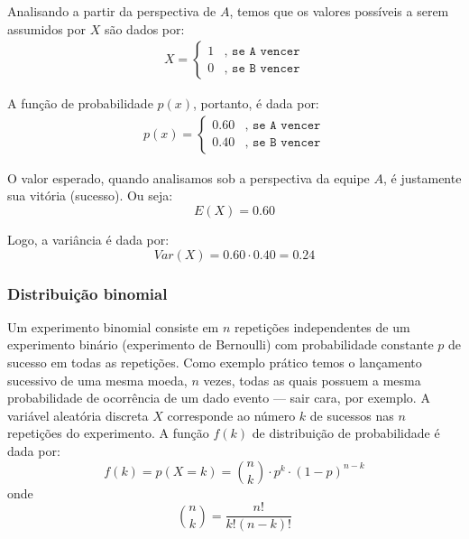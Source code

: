 \begin{sol}
Analisando a partir da perspectiva de $A$, temos que os valores possíveis a
serem assumidos por $X$ são dados por:
\begin{equation*}
    \begin{split}
    X =
    \begin{cases}
        1 & \texttt{, se A vencer} \\
        0 & \texttt{, se B vencer}
    \end{cases}
    \end{split}
\end{equation*}

A função de probabilidade $p(x)$, portanto, é dada por:
\begin{equation*}
    \begin{split}
    p(x) =
    \begin{cases}
        0.60 & \texttt{, se A vencer} \\
        0.40 & \texttt{, se B vencer}
    \end{cases}
    \end{split}
\end{equation*}

O valor esperado, quando analisamos sob a perspectiva da equipe $A$, é
justamente sua vitória (sucesso). Ou seja:
 \[
E(X) = 0.60
\]

Logo, a variância é dada por:
\[
Var(X) = 0.60 \cdot 0.40 = 0.24
\]
\end{sol}

\subsubsection{Distribuição binomial}
Um experimento binomial consiste em $n$ repetições independentes de um
experimento binário (experimento de Bernoulli) com probabilidade constante $p$
de sucesso em todas as repetições. Como exemplo prático temos o lançamento
sucessivo de uma mesma moeda, $n$ vezes, todas as quais possuem a mesma
probabilidade de ocorrência de um dado evento --- sair cara, por exemplo.
A variável aleatória discreta $X$ corresponde ao número $k$ de sucessos nas
$n$ repetições do experimento. A função $f(k)$ de distribuição de probabilidade
é dada por:
\begin{equation}
     f(k) = p(X = k) = \binom{n}{k} \cdot p^{k} \cdot (1-p)^{n-k}
     \label{eq:dist-binomial}
\end{equation}
onde
\[
    \binom{n}{k} = \frac{n!}{k!(n-k)!}
\]

